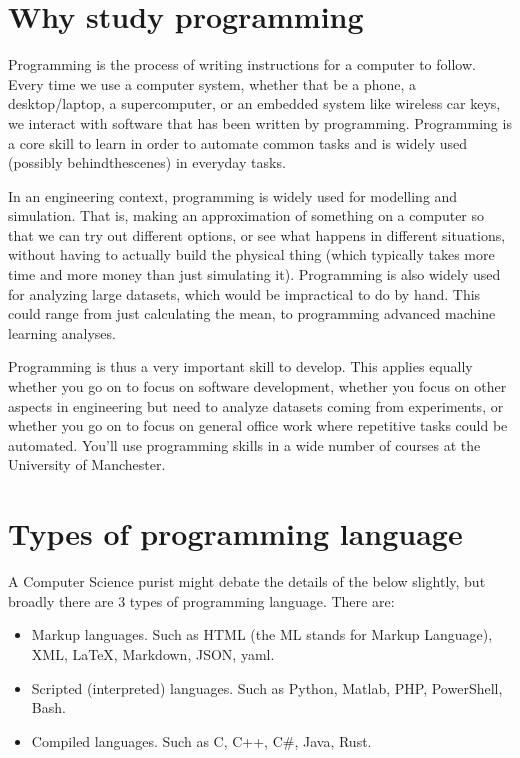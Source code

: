 \documentclass[letterpaper,10pt,british]{sphinxmanual}
\begin{document}
\sphinxstepscope


\section{Why study programming}
\label{\detokenize{chapters/motivation/why_programming:why-study-programming}}\label{\detokenize{chapters/motivation/why_programming::doc}}
\sphinxAtStartPar
Programming is the process of writing instructions for a computer to follow. Every time we use a computer system, whether that be a phone, a desktop/laptop, a super\sphinxhyphen{}computer, or an embedded system like wireless car keys, we interact with software that has been written by programming. Programming is a core skill to learn in order to automate common tasks and is widely used (possibly behind\sphinxhyphen{}the\sphinxhyphen{}scenes) in everyday tasks.

\sphinxAtStartPar
In an engineering context, programming is widely used for modelling and simulation. That is, making an approximation of something on a computer so that we can try out different options, or see what happens in different situations, without having to actually build the physical thing (which typically takes more time and more money than just simulating it). Programming is also widely used for analyzing large datasets, which would be impractical to do by hand. This could range from just calculating the mean, to programming advanced machine learning analyses.

\sphinxAtStartPar
Programming is thus a very important skill to develop. This applies equally whether you go on to focus on software development, whether you focus on other aspects in engineering but need to analyze datasets coming from experiments, or whether you go on to focus on general office work where repetitive tasks could be automated. You’ll use programming skills in a wide number of courses at the University of Manchester.

\sphinxstepscope


\section{Types of programming language}
\label{\detokenize{chapters/motivation/language_types:types-of-programming-language}}\label{\detokenize{chapters/motivation/language_types:language-types}}\label{\detokenize{chapters/motivation/language_types::doc}}
\sphinxAtStartPar
A Computer Science purist might debate the details of the below slightly, but broadly there are 3 types of programming language. There are:
\begin{itemize}
\item {} 
\sphinxAtStartPar
Markup languages. Such as HTML (the ML stands for Markup Language), XML, LaTeX, Markdown, JSON, yaml.

\item {} 
\sphinxAtStartPar
Scripted (interpreted) languages. Such as Python, Matlab, PHP, PowerShell, Bash.

\item {} 
\sphinxAtStartPar
Compiled languages. Such as C, C++, C\#, Java, Rust.

\end{itemize}
\end{document}
